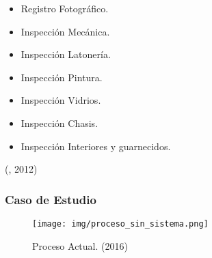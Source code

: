 \begin{itemize}

	\item Registro Fotográfico.

	\item Inspección Mecánica.

	\item Inspección Latonería.

	\item Inspección Pintura.

	\item Inspección Vidrios.

	\item Inspección Chasis.

	\item Inspección Interiores y guarnecidos.

\end{itemize}

(\citet{peritoIVbib}, 2012)

\subsubsection{Caso de Estudio}


\begin{figure}[H]
\begin{center}
	\texttt{[image: img/proceso\_sin\_sistema.png]}
\end{center}
\caption{Proceso Actual. (2016)}
\label{fig:proc_sin_sistema}
\end{figure}
\setlength{\parskip}{0mm}
